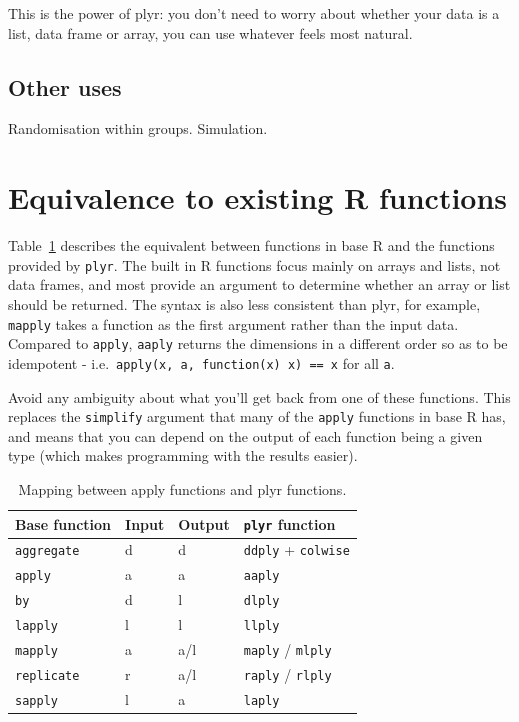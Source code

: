 \documentclass{scrartcl}
\newcommand{\code}[1]{\lstinline!#1!}
\newcommand{\plyr}{{\tt plyr}\xspace}
\begin{document}
This is the power of plyr: you don't need to worry about whether your data is a list, data frame or array, you can use whatever feels most natural.

\subsection{Other uses}

Randomisation within groups.  Simulation.

\section{Equivalence to existing R functions}
\label{sec:equiv}

Table~\ref{tbl:equiv} describes the equivalent between functions in base R and 
the functions provided by {\tt plyr}.  The built in R functions focus mainly on arrays and lists, not data frames, and most provide an argument to determine whether an array or list should be returned.  The syntax is also less consistent than plyr, for example, {\tt mapply} takes a function as the first argument rather than the input data.  Compared to {\tt apply}, {\tt aaply} returns the dimensions in a different order so as to be idempotent - i.e.\ {\tt apply(x, a, function(x) x) == x} for all {\tt a}. 

Avoid any ambiguity about what you'll get back from one of these functions. This replaces the {\tt simplify} argument that many of the {\tt apply} functions in base R has, and means that you can depend on the output of each function being a given type (which makes programming with the results easier).

\begin{table}[htpb]
  \begin{center}
  \begin{tabular}{llll}
    \toprule
    Base function & Input & Output & \plyr function \\
    \midrule
    \code{aggregate} & d & d   & \code{ddply} + \code{colwise} \\
    \code{apply }    & a & a   & \code{aaply} \\
    \code{by}        & d & l   & \code{dlply} \\
    \code{lapply}    & l & l   & \code{llply} \\
    \code{mapply}    & a & a/l & \code{maply} / \code{mlply} \\
    \code{replicate} & r & a/l & \code{raply} / \code{rlply} \\
    \code{sapply}    & l & a   & \code{laply} \\
    \bottomrule
  \end{tabular}
  \end{center}
  \caption{Mapping between apply functions and plyr functions.}
  \label{tbl:equiv}
\end{table}
\end{document}

